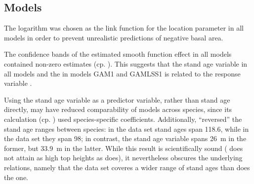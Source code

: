 \subsection{Models}

The logarithm was chosen as the link function for the location parameter in all models in order to prevent unrealistic predictions of negative basal area.

The confidence bands of the estimated smooth function effect in all models contained non-zero estimates (cp. ).  This suggests that the stand age variable in all models and the \ProductivityIndexVariableText{} in models GAM1 and GAMLSS1 is related to the response variable \parencite{Wood2001}.

Using the stand age variable as a predictor variable, rather than stand age directly, may have reduced comparability of models across species, since its calculation (cp. ) used species-specific coefficients. Additionally,  ``reversed'' the stand age ranges between species:  in the \Beech{} data set stand ages span \SI{118.6}{\year}, while in the \Spruce{} data set they span \SI{98}{\year};  in contrast, the stand age variable spans \SI{26}{\meter} in the former, but \SI{33.9}{\meter} in the latter.  While this result is scientifically sound (\Beech{} does not attain as high top heights as \Spruce{} does), it nevertheless obscures the underlying relations, namely that the \Beech{} data set coveres a wider range of stand ages than does the \Spruce{} one.

